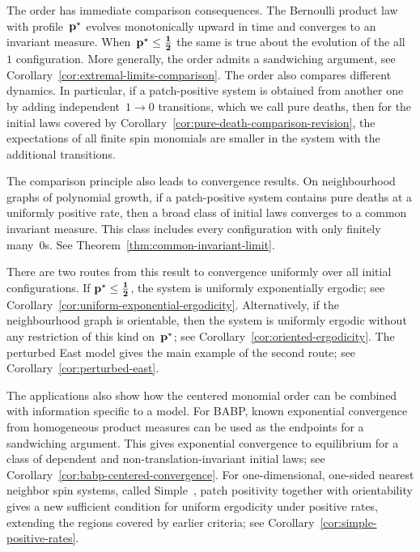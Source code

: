\documentclass[EJP,preprint,NODS,nobera]{ejpecp}
\begin{document}
The order has immediate comparison consequences. The Bernoulli product law
with profile~$\mathbf{p}^\star$ evolves monotonically upward in time and converges to an
invariant measure. When~$\mathbf{p}^\star\leq\boldsymbol{\tfrac12}$ the same is true about the evolution of the all~$1$ configuration.  More generally, the order admits a sandwiching argument, see Corollary~\ref{cor:extremal-limits-comparison}. The order also
compares different dynamics. In particular, if a patch-positive system is
obtained from another one by adding independent~$1\to0$ transitions, which we call pure deaths, then
for the initial laws covered by Corollary~\ref{cor:pure-death-comparison-revision},
the expectations of all finite spin monomials are smaller in the system with
the additional transitions.

The comparison principle also leads to convergence results. On neighbourhood
graphs of polynomial growth, if a patch-positive system contains pure deaths at a uniformly positive rate, then a broad class of
initial laws converges to a common invariant measure. This class includes every
configuration with only finitely many~$0$s. See
Theorem~\ref{thm:common-invariant-limit}.

There are two routes from this result to convergence uniformly
over all initial configurations. If
$\mathbf{p}^\star\leq\boldsymbol{\tfrac12}$, the system is uniformly exponentially
ergodic; see Corollary~\ref{cor:uniform-exponential-ergodicity}. Alternatively,
if the neighbourhood graph is orientable, then the system is uniformly
ergodic without any restriction of this kind on~$\mathbf{p}^\star$; see
Corollary~\ref{cor:oriented-ergodicity}. The perturbed East model gives the main example
of the second route; see Corollary~\ref{cor:perturbed-east}.

The applications also show how the centered monomial order can be combined
with information specific to a model. For BABP, known exponential convergence
from homogeneous product measures can be used as the endpoints for a sandwiching argument. This gives exponential convergence to equilibrium for a
class of dependent and non-translation-invariant initial laws; see
Corollary~\ref{cor:babp-centered-convergence}. For one-dimensional, one-sided nearest neighbor spin systems, called Simple~\cite{GluchowskiMenz2025,GluchowskiMenz2026}, patch positivity together with orientability gives a new sufficient
condition for uniform ergodicity under positive rates, extending the regions
covered by earlier criteria; see
Corollary~\ref{cor:simple-positive-rates}.
\end{document}
